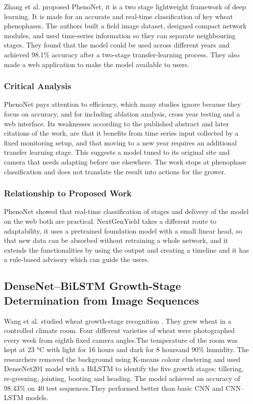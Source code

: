 \documentclass{FastFyp}
\begin{document}
Zhang et al. \cite{ref:Zhang:2024} proposed PhenoNet, it is a two stage lightweight framework of deep learning. It is made for an accurate and real-time classification of key wheat phenophases. The authors built a field image dataset, designed compact network modules, and used time-series information so they can separate neighbouring stages. They found that the model could be used across different years and achieved 98.1\% accuracy after a two-stage transfer-learning process. They also made a web application to make the model available to users.

\subsubsection{Critical Analysis}
PhenoNet pays attention to efficiency, which many studies ignore because they focus on accuracy, and for including ablation analysis, cross year testing and a web interface. Its weaknesses according to the published abstract and later citations of the work, are that it benefits from time series input collected by a fixed monitoring setup, and that moving to a new year requires an additional transfer learning stage. This suggests a model tuned to its original site and camera that needs adapting before use elsewhere. The work stops at phenophase classification and does not translate the result into actions for the grower.

\subsubsection{Relationship to Proposed Work}
PhenoNet showed that real-time classification of stages and delivery of the model on the web both are practical. NextGenYield takes a different route to adaptability, it uses a pretrained foundation model with a small linear head, so that new data can be absorbed without retraining a whole network, and it extends the functionalities by using the output and creating a timeline and it has a rule-based advisory which can guide the users.

\subsection{DenseNet--BiLSTM Growth-Stage Determination from Image Sequences}

Wang et al. \cite{ref:Wang:2025} studied wheat growth-stage recognition . They grew wheat in a controlled climate room. Four different varieties of wheat were photographed every week from eighth fixed camera angles.The temperature of the room was kept at 23 °C with light for 16 hours and dark for 8 hoursand 90\% humidity. The researchers removed the background using K-means colour clustering and used DenseNet201 model with a BiLSTM to identify the five growth stages: tillering, re-greening, jointing, booting and heading. The model achieved an accuracy of 98.43\% on 40 test sequences.They performed better than basic CNN and CNN--LSTM models.
\end{document}
